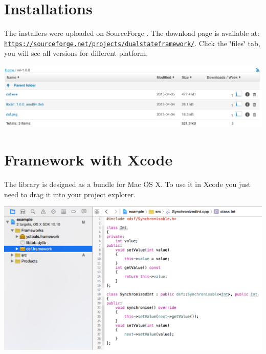 \hypertarget{_project_description_ProjectDescriptionInstallations}{}\section{Installations}\label{_project_description_ProjectDescriptionInstallations}
The installers were uploaded on Source\+Forge \cite{sourceforge}. The download page is available at\+: \href{https://sourceforge.net/projects/dualstateframework/}{\tt https\+://sourceforge.\+net/projects/dualstateframework/}. Click the \char`\"{}files\char`\"{} tab, you will see all versions for different platform. 
\begin{DoxyImageNoCaption}
  \mbox{\includegraphics[width=\textwidth,height=\textheight/2,keepaspectratio=true]{ReportDescriptionInstallations.png}}
\end{DoxyImageNoCaption}
\hypertarget{_project_description_ProjectDescriptionFrameworkwithXcode}{}\section{Framework with Xcode}\label{_project_description_ProjectDescriptionFrameworkwithXcode}
The library is designed as a bundle \cite{bundle} for Mac O\+S X. To use it in Xcode you just need to drag it into your project explorer. 
\begin{DoxyImageNoCaption}
  \mbox{\includegraphics[width=\textwidth,height=\textheight/2,keepaspectratio=true]{ReportDescriptionXcode.png}}
\end{DoxyImageNoCaption}
